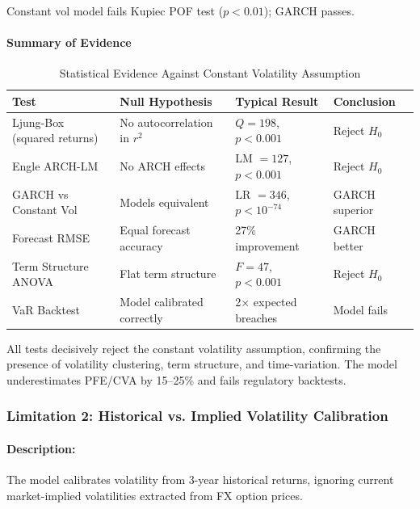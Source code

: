Constant vol model fails Kupiec POF test ($p < 0.01$); GARCH passes.

\paragraph{Summary of Evidence}

\begin{table}[h!]
	\centering
	\small
	\begin{tabular}{|p{3.5cm}|p{4cm}|p{4cm}|p{2cm}|}
		\hline
		\textbf{Test} & \textbf{Null Hypothesis} & \textbf{Typical Result} & \textbf{Conclusion} \\
		\hline
		Ljung-Box (squared returns) & No autocorrelation in $r^2$ & $Q = 198$, $p < 0.001$ & Reject $H_0$ \\
		\hline
		Engle ARCH-LM & No ARCH effects & LM $= 127$, $p < 0.001$ & Reject $H_0$ \\
		\hline
		GARCH vs Constant Vol & Models equivalent & LR $= 346$, $p < 10^{-74}$ & GARCH superior \\
		\hline
		Forecast RMSE & Equal forecast accuracy & 27\% improvement & GARCH better \\
		\hline
		Term Structure ANOVA & Flat term structure & $F = 47$, $p < 0.001$ & Reject $H_0$ \\
		\hline
		VaR Backtest & Model calibrated correctly & 2× expected breaches & Model fails \\
		\hline
	\end{tabular}
	\caption{Statistical Evidence Against Constant Volatility Assumption}
\end{table}

All tests decisively reject the constant volatility assumption, confirming the presence of volatility clustering, term structure, and time-variation. The model underestimates PFE/CVA by 15--25\% and fails regulatory backtests.
\newpage







\subsubsection{Limitation 2: Historical vs. Implied Volatility Calibration}

\paragraph{Description:}
The model calibrates volatility from 3-year historical returns, ignoring current market-implied volatilities extracted from FX option prices.

